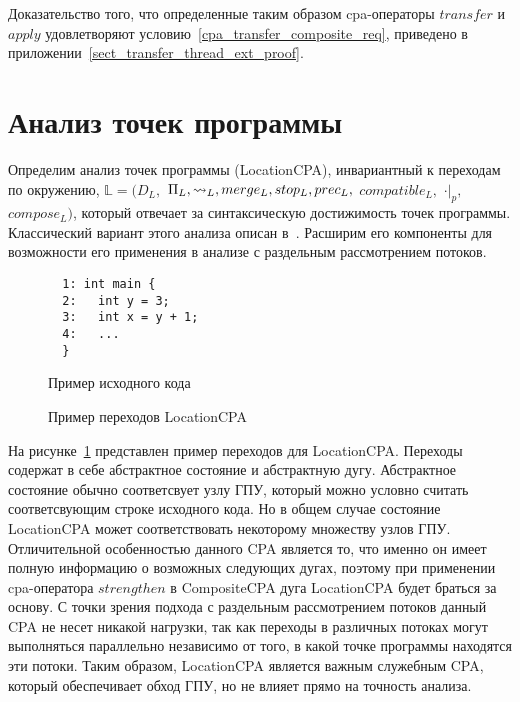 Доказательство того, что определенные таким образом cpa-операторы $transfer$ и $apply$ удовлетворяют условию~\ref{cpa_transfer_composite_req}, приведено в приложении~\ref{sect_transfer_thread_ext_proof}. 


\section{Анализ точек программы}
\label{sect_location_analysis}

Определим анализ точек программы (LocationCPA), инвариантный к переходам по окружению,
$\mathbb{L}=(D_{L},$ $\Pi_{L}, \leadsto_{L}, merge_{L}, stop_{L}, prec_{L},$ $compatible_{L},$ $\cdot|_p,$ $compose_L)$, который отвечает за синтаксическую достижимость точек программы.
Классический вариант этого анализа описан в~\cite{Beyer08}.
Расширим его компоненты для возможности его применения в анализе с раздельным рассмотрением потоков.

\begin{figure}[h]
\begin{minipage}[h]{0.3\textwidth}
\begin{verbatim}
  1: int main {
  2:   int y = 3;
  3:   int x = y + 1;
  4:   ...
  }
\end{verbatim}
\caption{Пример исходного кода}
\label{LocationCodeExample}
\end{minipage}
\hfill
\begin{minipage}{0.6\textwidth}
    \caption{Пример переходов LocationCPA}
    \label{img:LocationCPA}
\end{minipage}
\end{figure}

На рисунке~\ref{img:LocationCPA} представлен пример переходов для LocationCPA. 
Переходы содержат в себе абстрактное состояние и абстрактную дугу.
Абстрактное состояние обычно соответсвует узлу ГПУ, который можно условно считать соответсвующим строке исходного кода.
Но в общем случае состояние LocationCPA может соответствовать некоторому множеству узлов ГПУ.
Отличительной особенностью данного CPA является то, что именно он имеет полную информацию о возможных следующих дугах, поэтому при применении cpa-оператора $strengthen$ в CompositeCPA дуга LocationCPA будет браться за основу.
С точки зрения подхода с раздельным рассмотрением потоков данный CPA не несет никакой нагрузки, так как переходы в различных потоках могут выполняться параллельно независимо от того, в какой точке программы находятся эти потоки.
Таким образом, LocationCPA является важным служебным CPA, который обеспечивает обход ГПУ, но не влияет прямо на точность анализа.

